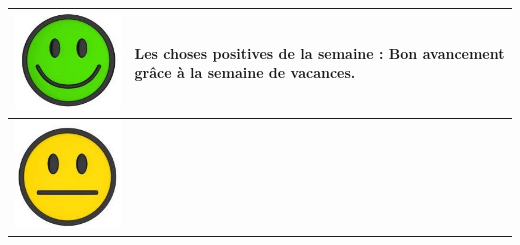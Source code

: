 \documentclass[12pt,titlepage,french]{article}
\begin{document}
\noindent\begin{tabularx}{17cm}{|p{5cm}|X|}
\hline
   \begin{minipage}{.3\textwidth}
      \includegraphics[width=\linewidth]{img/smhappy.jpg}
    \end{minipage}
    & 
    Les choses positives de la semaine : Bon avancement grâce à la semaine de vacances.\\
\hline
     \begin{minipage}{.3\textwidth}
      \includegraphics[width=\linewidth]{img/smneutral.jpg}

\end{minipage}
\end{tabularx}
\end{document}
